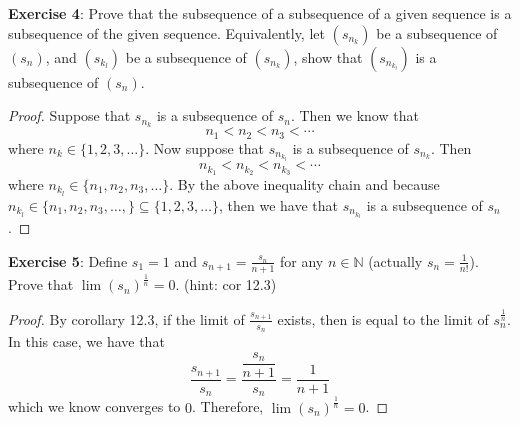 \documentclass{article}
\begin{document}
\textbf{Exercise 4}: Prove that the subsequence of a subsequence of a given sequence is a subsequence of the given sequence. Equivalently, let $(s_{n_{k}})$ be a subsequence of $(s_{n})$, and $(s_{k_{l}})$ be a subsequence of $(s_{n_{k}})$, show that $(s_{n_{k_{l}}})$ is a subsequence of $(s_{n})$.
    \begin{proof}
        Suppose that $s_{n_{k}}$ is a subsequence of $s_{n}$. Then we know that
            \begin{equation*}
                n_{1} < n_{2} < n_{3} < \cdots 
            \end{equation*}
        where $n_{k} \in \{1, 2, 3, \ldots \}$. Now suppose that $s_{n_{k_{l}}}$ is a subsequence of $s_{n_{k}}$. Then
            \begin{equation*}
                n_{k_{1}} < n_{k_{2}} < n_{k_{3}} < \cdots 
            \end{equation*}
        where $n_{k_{l}} \in \{n_{1}, n_{2}, n_{3}, \ldots\}$. By the above inequality chain and because $n_{k_{l}} \in \{n_{1}, n_{2}, n_{3}, \ldots , \} \subseteq \{1, 2, 3, \ldots \}$, then we have that $s_{n_{k_{l}}}$ is a subsequence of $s_{n}$.
    \end{proof}

\textbf{Exercise 5}: Define $s_{1} = 1$ and $s_{n + 1} = \frac{s_{n}}{n + 1}$ for any $n \in \mathbb{N}$ (actually $s_{n} = \frac{1}{n!}$). Prove that $\lim(s_{n})^{\frac{1}{n}} = 0$. (hint: cor 12.3)
    \begin{proof}
        By corollary 12.3, if the limit of $\frac{s_{n + 1}}{s_{n}}$ exists, then is equal to the limit of $s_{n}^{\frac{1}{n}}$. In this case, we have that 
            \begin{equation*}
                \dfrac{s_{n + 1}}{s_{n}} = \dfrac{\dfrac{s_{n}}{n + 1}}{s_{n}} = \dfrac{1}{n + 1}
            \end{equation*}
        which we know converges to $0$. Therefore, $\lim(s_{n})^{\frac{1}{n}} = 0$.
    \end{proof}
\end{document}
